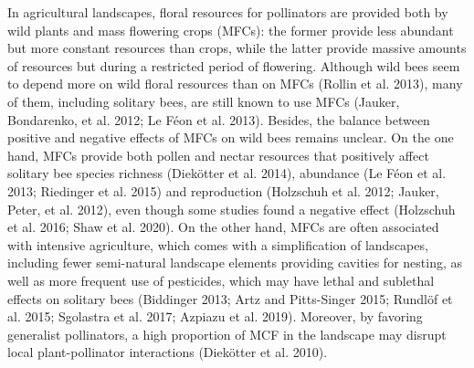 \documentclass[smallextended]{svjour3}       %
\begin{document}
In agricultural landscapes, floral resources for pollinators are
provided both by wild plants and mass flowering crops (MFCs): the former
provide less abundant but more constant resources than crops, while the
latter provide massive amounts of resources but during a restricted
period of flowering. Although wild bees seem to depend more on wild
floral resources than on MFCs (Rollin et al. 2013), many of them,
including solitary bees, are still known to use MFCs (Jauker,
Bondarenko, et al. 2012; Le Féon et al. 2013). Besides, the balance
between positive and negative effects of MFCs on wild bees remains
unclear. On the one hand, MFCs provide both pollen and nectar resources
that positively affect solitary bee species richness (Diekötter et al.
2014), abundance (Le Féon et al. 2013; Riedinger et al. 2015) and
reproduction (Holzschuh et al. 2012; Jauker, Peter, et al. 2012), even
though some studies found a negative effect (Holzschuh et al. 2016; Shaw
et al. 2020). On the other hand, MFCs are often associated with
intensive agriculture, which comes with a simplification of landscapes,
including fewer semi-natural landscape elements providing cavities for
nesting, as well as more frequent use of pesticides, which may have
lethal and sublethal effects on solitary bees (Biddinger 2013; Artz and
Pitts-Singer 2015; Rundlöf et al. 2015; Sgolastra et al. 2017; Azpiazu
et al. 2019). Moreover, by favoring generalist pollinators, a high
proportion of MCF in the landscape may disrupt local plant-pollinator
interactions (Diekötter et al. 2010).
\end{document}
